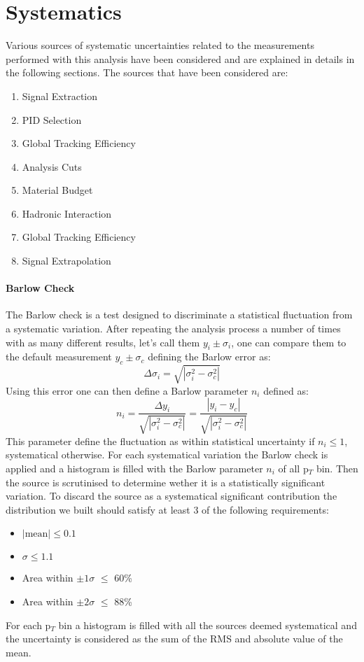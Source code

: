 \section{Systematics}
\label{sec:Systematics}
Various sources of systematic uncertainties related to the measurements performed with this analysis have been considered and are explained in details in the following sections. The sources that have been considered are:
\begin{enumerate}
\item Signal Extraction
\item PID Selection
\item	Global Tracking Efficiency
\item	Analysis Cuts
\item Material Budget
\item Hadronic Interaction
\item	Global Tracking Efficiency
\item	Signal Extrapolation
\end{enumerate}

\paragraph{Barlow Check}
The Barlow check is a test designed to discriminate a statistical fluctuation from a systematic variation. After repeating the analysis process a number of times with as many different results, let's call them $y_i \pm \sigma_i$, one can compare them to the default measurement $y_c \pm \sigma_c$ defining the Barlow error as:
\begin{equation}
\Delta\sigma_i = \sqrt{|\sigma_i^2-\sigma_c^2|}
\end{equation}
Using this error one can then define a Barlow parameter $n_i$ defined as:
\begin{equation}
n_i = \frac{\Delta y_i}{\sqrt{|\sigma_i^2-\sigma_c^2|}} =  \frac{|y_i - y_c|}{\sqrt{|\sigma_i^2-\sigma_c^2|}}
\end{equation}
This parameter define the fluctuation as within statistical uncertainty if $n_i \leq 1$, systematical otherwise. For each systematical variation the Barlow check is applied and a histogram is filled with the Barlow parameter $n_i$ of all p$_{T}$ bin. Then the source is scrutinised to determine wether it is a statistically significant variation. To discard the source as a systematical significant contribution the distribution we built should satisfy at least 3 of the following requirements:
\begin{itemize}
\item $|\text{mean}| \leq 0.1$
\item $\sigma \leq 1.1$
\item Area within $\pm 1 \sigma$ $\leq$ 60\%
\item Area within $\pm 2 \sigma$ $\leq$ 88\%
\end{itemize}
For each p$_{T}$ bin a histogram is filled with all the sources deemed systematical and the uncertainty is considered as the sum of the RMS and absolute value of the mean.

